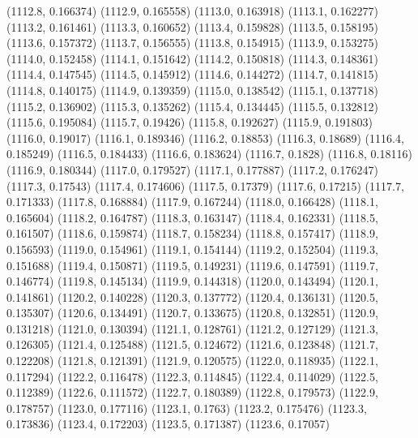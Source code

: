 {					(1112.8, 0.166374)
					(1112.9, 0.165558)
					(1113.0, 0.163918)
					(1113.1, 0.162277)
					(1113.2, 0.161461)
					(1113.3, 0.160652)
					(1113.4, 0.159828)
					(1113.5, 0.158195)
					(1113.6, 0.157372)
					(1113.7, 0.156555)
					(1113.8, 0.154915)
					(1113.9, 0.153275)
					(1114.0, 0.152458)
					(1114.1, 0.151642)
					(1114.2, 0.150818)
					(1114.3, 0.148361)
					(1114.4, 0.147545)
					(1114.5, 0.145912)
					(1114.6, 0.144272)
					(1114.7, 0.141815)
					(1114.8, 0.140175)
					(1114.9, 0.139359)
					(1115.0, 0.138542)
					(1115.1, 0.137718)
					(1115.2, 0.136902)
					(1115.3, 0.135262)
					(1115.4, 0.134445)
					(1115.5, 0.132812)
					(1115.6, 0.195084)
					(1115.7, 0.19426)
					(1115.8, 0.192627)
					(1115.9, 0.191803)
					(1116.0, 0.19017)
					(1116.1, 0.189346)
					(1116.2, 0.18853)
					(1116.3, 0.18689)
					(1116.4, 0.185249)
					(1116.5, 0.184433)
					(1116.6, 0.183624)
					(1116.7, 0.1828)
					(1116.8, 0.18116)
					(1116.9, 0.180344)
					(1117.0, 0.179527)
					(1117.1, 0.177887)
					(1117.2, 0.176247)
					(1117.3, 0.17543)
					(1117.4, 0.174606)
					(1117.5, 0.17379)
					(1117.6, 0.17215)
					(1117.7, 0.171333)
					(1117.8, 0.168884)
					(1117.9, 0.167244)
					(1118.0, 0.166428)
					(1118.1, 0.165604)
					(1118.2, 0.164787)
					(1118.3, 0.163147)
					(1118.4, 0.162331)
					(1118.5, 0.161507)
					(1118.6, 0.159874)
					(1118.7, 0.158234)
					(1118.8, 0.157417)
					(1118.9, 0.156593)
					(1119.0, 0.154961)
					(1119.1, 0.154144)
					(1119.2, 0.152504)
					(1119.3, 0.151688)
					(1119.4, 0.150871)
					(1119.5, 0.149231)
					(1119.6, 0.147591)
					(1119.7, 0.146774)
					(1119.8, 0.145134)
					(1119.9, 0.144318)
					(1120.0, 0.143494)
					(1120.1, 0.141861)
					(1120.2, 0.140228)
					(1120.3, 0.137772)
					(1120.4, 0.136131)
					(1120.5, 0.135307)
					(1120.6, 0.134491)
					(1120.7, 0.133675)
					(1120.8, 0.132851)
					(1120.9, 0.131218)
					(1121.0, 0.130394)
					(1121.1, 0.128761)
					(1121.2, 0.127129)
					(1121.3, 0.126305)
					(1121.4, 0.125488)
					(1121.5, 0.124672)
					(1121.6, 0.123848)
					(1121.7, 0.122208)
					(1121.8, 0.121391)
					(1121.9, 0.120575)
					(1122.0, 0.118935)
					(1122.1, 0.117294)
					(1122.2, 0.116478)
					(1122.3, 0.114845)
					(1122.4, 0.114029)
					(1122.5, 0.112389)
					(1122.6, 0.111572)
					(1122.7, 0.180389)
					(1122.8, 0.179573)
					(1122.9, 0.178757)
					(1123.0, 0.177116)
					(1123.1, 0.1763)
					(1123.2, 0.175476)
					(1123.3, 0.173836)
					(1123.4, 0.172203)
					(1123.5, 0.171387)
					(1123.6, 0.17057)
}
